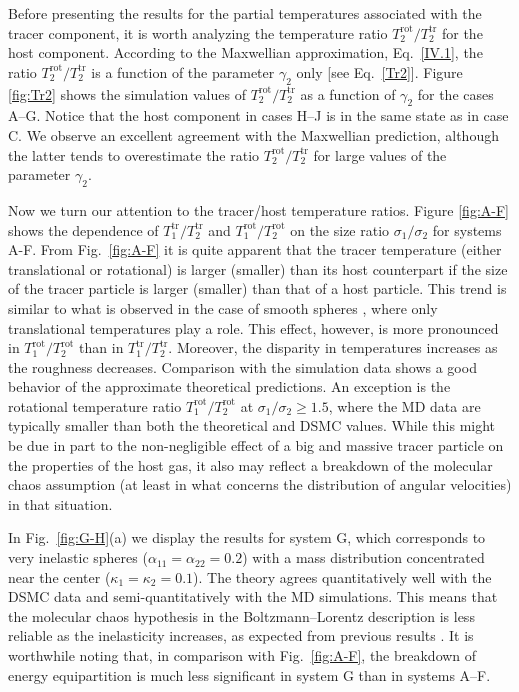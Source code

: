 \documentclass[aps,pre,reprint]{revtex4-1}
\newcommand{\Tt}{T^{\text{tr}}}
\newcommand{\Tr}{T^{\text{rot}}}
\begin{document}
Before presenting the results for the partial temperatures associated with the tracer
component, it is worth  analyzing the temperature ratio $\Tr_2/\Tt_2$ for the host component.
According to the Maxwellian approximation, Eq.\ \eqref{IV.1}, the ratio  $\Tr_2/\Tt_2$ is a function of the parameter $\gamma_2$ only [see Eq.\ \eqref{Tr2}]. Figure \ref{fig:Tr2} shows the simulation values of $\Tr_2/\Tt_2$ as a function of $\gamma_2$ for the cases A--G. Notice that the host component in cases H--J is in the same state as in case C. We observe an excellent agreement with the Maxwellian prediction, although the latter tends to overestimate the ratio  $\Tr_2/\Tt_2$ for large values of the parameter $\gamma_2$.

Now we turn our attention to the tracer/host temperature ratios. Figure \ref{fig:A-F} shows the dependence of $\Tt_1/\Tt_2$ and $\Tr_1/\Tr_2$ on the size ratio $\sigma_1/\sigma_2$ for systems A-F.
From Fig.\ \ref{fig:A-F} it is quite apparent that the tracer temperature (either translational or rotational) is larger (smaller) than its host counterpart if the size of the tracer particle is larger (smaller) than that of a host particle. This trend is similar to what is observed in the case of smooth spheres \cite{MG02b,DHGD02}, where only translational temperatures play a role. This effect, however, is more pronounced in  $\Tr_1/\Tr_2$ than in $\Tt_1/\Tt_2$. Moreover, the disparity in temperatures increases as the roughness decreases. Comparison with the simulation data shows a good behavior of the approximate theoretical predictions.
An exception is the rotational temperature ratio $\Tr_1/\Tr_2$ at $\sigma_1/\sigma_2\geq 1.5$, where the MD data are typically smaller than both the theoretical and DSMC values. While this might be due in part to the non-negligible effect of a big and massive tracer particle on the properties of the host gas, it  also may reflect a breakdown of the molecular chaos assumption (at least in what concerns the distribution of angular velocities) in that situation.

In Fig.\ \ref{fig:G-H}(a) we display the results for system G, which corresponds to very inelastic spheres ($\alpha_{11}=\alpha_{22}=0.2$) with a  mass distribution concentrated near the center ($\kappa_1=\kappa_2=0.1$). The theory agrees quantitatively well with the DSMC data and semi-quantitatively with the MD simulations. This means that the molecular chaos hypothesis in the Boltzmann--Lorentz description is less reliable as the inelasticity increases, as expected from previous results \cite{DHGD02}. It is worthwhile noting that, in comparison with Fig.\ \ref{fig:A-F}, the breakdown of energy equipartition is much less significant in system G than in systems A--F.
\end{document}
